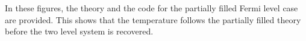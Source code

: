 In these figures, the theory and the code for the partially filled Fermi level case are provided. This shows that the temperature follows the partially filled theory before the two level system is recovered.
